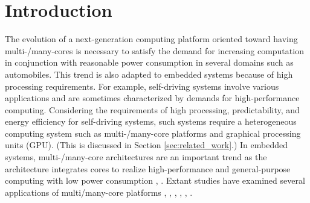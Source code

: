 


\chapter{Introduction}
\label{sec:introduction}
The evolution of a next-generation computing platform oriented toward having multi-/many-cores is necessary to satisfy the demand for increasing computation in conjunction with reasonable power consumption in several domains such as automobiles.
This trend is also adapted to embedded systems because of high processing requirements.
For example, self-driving systems involve various applications and are sometimes characterized by demands for high-performance computing.
Considering the requirements of high processing, predictability, and energy efficiency for self-driving systems, such systems require a heterogeneous computing system such as multi-/many-core platforms and graphical processing units (GPU).
(This is discussed in Section \ref{sec:related_work}.)
 In embedded systems, multi-/many-core architectures are an important trend as the architecture integrates cores to realize high-performance and general-purpose computing with low power consumption \cite{becker2016contention}, \cite{perret2016mapping}.
Extant studies have examined several applications of multi/many-core platforms \cite{becker2016contention}, \cite{saidi2015shift}, \cite{perret2016temporal}, \cite{perret2016mapping}, \cite{becker2014mapping}, \cite{BURGIO2017299}.

